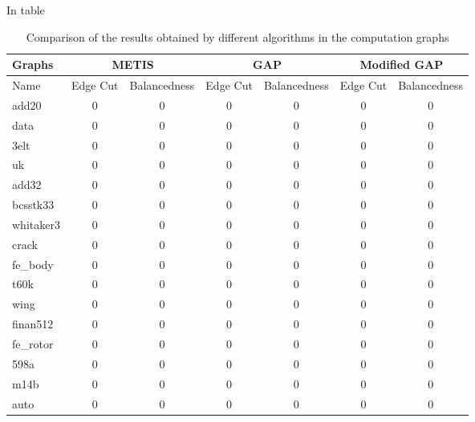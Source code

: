 In table 

\begin{table}
\centering
\begin{tabular}{ |p{1.75cm}||cc|cc|cc|  }
\hline
\hline
\textbf{Graphs} & \multicolumn{2}{c}{\textbf{METIS}} & \multicolumn{2}{c}{\textbf{GAP}} & \multicolumn{2}{c|}{\textbf{Modified GAP}} \\
\hline
\hline
Name & Edge Cut & Balancedness & Edge Cut & Balancedness & Edge Cut & Balancedness \\
\hline
add20 & 0 & 0 & 0 & 0 & 0 & 0  \\
data & 0 & 0 & 0 & 0 & 0 & 0  \\
3elt & 0 & 0 & 0 & 0 & 0 & 0  \\
uk & 0 & 0 & 0 & 0 & 0 & 0  \\
add32 & 0 & 0 & 0 & 0 & 0 & 0  \\
bcsstk33 & 0 & 0 & 0 & 0 & 0 & 0  \\
whitaker3 & 0 & 0 & 0 & 0 & 0 & 0  \\
crack & 0 & 0 & 0 & 0 & 0 & 0  \\
\hline
fe\_body & 0 & 0 & 0 & 0 & 0 & 0  \\
t60k & 0 & 0 & 0 & 0 & 0 & 0  \\
wing & 0 & 0 & 0 & 0 & 0 & 0  \\
finan512 & 0 & 0 & 0 & 0 & 0 & 0  \\
\hline
fe\_rotor & 0 & 0 & 0 & 0 & 0 & 0  \\
598a & 0 & 0 & 0 & 0 & 0 & 0  \\
m14b & 0 & 0 & 0 & 0 & 0 & 0  \\
auto & 0 & 0 & 0 & 0 & 0 & 0  \\
\hline
\end{tabular}
\caption{\label{tab:comp_graphs}Comparison of the results obtained by different algorithms in the computation graphs}
\end{table}